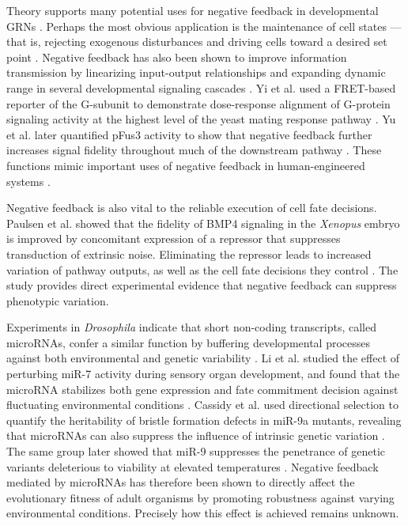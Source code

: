 Theory supports many potential uses for negative feedback in developmental GRNs \cite{Freeman2000}. Perhaps the most obvious application is the maintenance of cell states --- that is, rejecting exogenous disturbances and driving cells toward a desired set point \cite{Alon2007,Behar2007,Yi2000}. Negative feedback has also been shown to improve information transmission by linearizing input-output relationships and expanding dynamic range in several developmental signaling cascades \cite{Bhalla2002,Cheong2011,Paulsen2011,Yi2003,Yu2008}. Yi et al. used a FRET-based reporter of the G\textalpha-subunit to demonstrate dose-response alignment of G-protein signaling activity at the highest level of the yeast mating response pathway \cite{Yi2003}. Yu et al. later quantified pFus3 activity to show that negative feedback further increases signal fidelity throughout much of the downstream pathway \cite{Yu2008}. These functions mimic important uses of negative feedback in human-engineered systems \cite{Khammash2016}.

Negative feedback is also vital to the reliable execution of cell fate decisions. Paulsen et al. showed that the fidelity of BMP4 signaling in the \textit{Xenopus} embryo is improved by concomitant expression of a repressor that suppresses transduction of extrinsic noise. Eliminating the repressor leads to increased variation of pathway outputs, as well as the cell fate decisions they control \cite{Paulsen2011}. The study provides direct experimental evidence that negative feedback can suppress phenotypic variation. 

Experiments in \textit{Drosophila} indicate that short non-coding transcripts, called microRNAs, confer a similar function by buffering developmental processes against both environmental and genetic variability \cite{Cassidy2016,Cassidy2013,Li2009,Ebert2012}. Li et al. studied the effect of perturbing miR-7 activity during sensory organ development, and found that the microRNA stabilizes both gene expression and fate commitment decision against fluctuating environmental conditions \cite{Li2009}. Cassidy et al. used directional selection to quantify the heritability of bristle formation defects in miR-9a mutants, revealing that microRNAs can also suppress the influence of intrinsic genetic variation \cite{Cassidy2013}. The same group later showed that miR-9 suppresses the penetrance of genetic variants deleterious to viability at elevated temperatures \cite{Cassidy2016}. Negative feedback mediated by microRNAs has therefore been shown to directly affect the evolutionary fitness of adult organisms by promoting robustness against varying environmental conditions. Precisely how this effect is achieved remains unknown.

